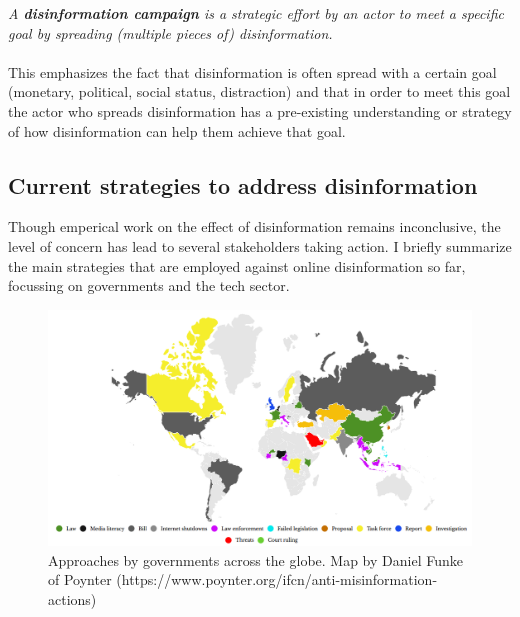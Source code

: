 \documentclass[10pt,a4paper]{article}
\begin{document}
\textit{A \textbf{disinformation campaign} is a strategic effort by an actor to meet a specific goal by spreading (multiple pieces of) disinformation.} \\ \\

This emphasizes the fact that disinformation is often spread with a certain goal (monetary, political, social status, distraction) and that in order to meet this goal the actor who spreads disinformation has a pre-existing understanding or strategy of how disinformation can help them achieve that goal.



\subsection{Current strategies to address disinformation} \label{sec:strategies}
Though emperical work on the effect of disinformation remains inconclusive, the level of concern has lead to several stakeholders taking action. I briefly summarize the main strategies that are employed against online disinformation so far, focussing on governments and the tech sector. \\

\begin{figure}
	\includegraphics[scale=0.7]{govinitiatives.png}
	\caption{Approaches by governments across the globe. Map by Daniel Funke of Poynter (https://www.poynter.org/ifcn/anti-misinformation-actions)}
	\centering
	\label{img:govtresponse}
\end{figure}
\end{document}
